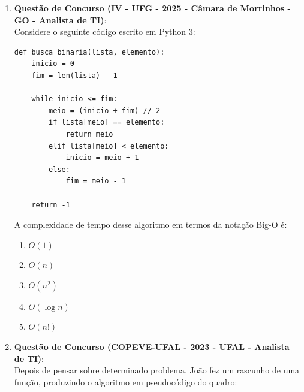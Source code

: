 \documentclass[12pt]{article}
\begin{document}
\begin{enumerate}[label=\arabic*), leftmargin=1.5cm, itemsep=0.8cm]
    "Para grandes volumes de dados, um algoritmo com complexidade de tempo $O(n)$ (linear) é considerado menos eficiente que um algoritmo com complexidade de tempo $O(n \log n)$, uma vez que o crescimento linear é mais acentuado que o crescimento logarítmico."
    
    \begin{itemize}
        \item[($\quad$)] Certo
        \item[($\quad$)] Errado
    \end{itemize}

    \item \textbf{Questão de Concurso (IV - UFG - 2025 - Câmara de Morrinhos - GO - Analista de TI)}: \\
    Considere o seguinte código escrito em Python 3:
    
    \begin{tcolorbox}[colback=white, colframe=black, fontupper=\small]
\begin{verbatim}
def busca_binaria(lista, elemento):
    inicio = 0
    fim = len(lista) - 1
    
    while inicio <= fim:
        meio = (inicio + fim) // 2
        if lista[meio] == elemento:
            return meio
        elif lista[meio] < elemento:
            inicio = meio + 1
        else:
            fim = meio - 1
            
    return -1
\end{verbatim}
    \end{tcolorbox}
    
    A complexidade de tempo desse algoritmo em termos da notação Big-O é:
    
    \begin{enumerate}[label=\Alph*)]
        \item $O(1)$
        \item $O(n)$
        \item $O(n^2)$
        \item $O(\log n)$
        \item $O(n!)$
    \end{enumerate}

    \item \textbf{Questão de Concurso (COPEVE-UFAL - 2023 - UFAL - Analista de TI)}: \\
    Depois de pensar sobre determinado problema, João fez um rascunho de uma função, produzindo o algoritmo em pseudocódigo do quadro: 
    

\end{enumerate}
\end{document}
